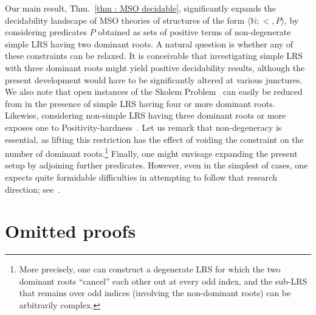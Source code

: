 \documentclass[a4paper,UKenglish,cleveref, autoref, thm-restate]{lipics-v2021}
\newcommand{\nat} {\mathbb{N}}
\begin{document}
  Our main result, Thm.~\ref{thm : MSO decidable}, significantly
  expands the decidability landscape of MSO theories of structures of
  the form $\langle \nat ; <, P \rangle$, by considering predicates
  $P$ obtained as sets of positive terms of non-degenerate simple LRS
  having two dominant roots. A natural question is whether any of
  these constraints can be relaxed. It is conceivable that
  investigating simple LRS with three dominant roots might yield
  positive decidability results, although the present development
  would have to be significantly altered at various junctures.  We
  also note that open instances of the Skolem Problem~\cite{recseq}
  can easily be reduced from in the presence of simple LRS having four
  or more dominant roots. Likewise, considering non-simple LRS having
  three dominant roots or more exposes one to
  Positivity-hardness~\cite{OW14}. Let us remark that non-degeneracy
  is essential, as lifting this restriction has the effect of voiding
  the constraint on the number of dominant roots.\footnote{More
    precisely, one can construct a degenerate LRS for which the two
    dominant roots ``cancel'' each other out at every odd index, and the
    sub-LRS that remains over odd indices (involving the non-dominant
    roots) can be arbitrarily complex.} Finally, one might
  envisage expanding the present setup by adjoining further
  predicates. However, even in the simplest of cases, one expects
  quite formidable difficulties in attempting to follow that research
  direction; see~\cite{berthe2024decidability}.





\appendix

\section{Omitted proofs}\label{sec : omitted proofs}
\end{document}
